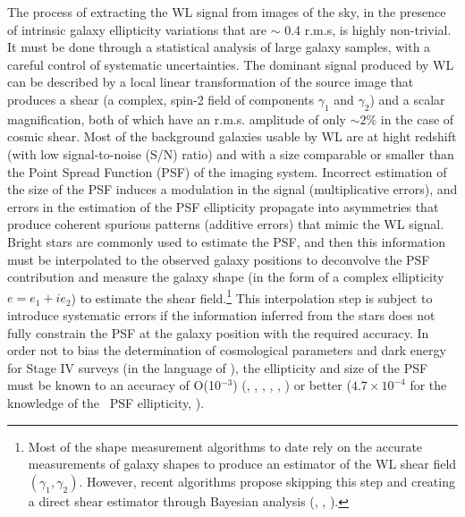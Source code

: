 \documentclass[11pt,preprint,flushrt]{aastex}
\begin{document}
The process of extracting the WL signal from images of the sky, in the presence of intrinsic galaxy ellipticity variations that are $\sim$ 0.4 r.m.s, is highly non-trivial. It must be done through a statistical analysis of large galaxy samples, with a careful control of systematic uncertainties. The dominant signal produced by WL can be described by a local linear transformation of the source image that produces a shear (a complex, spin-2 field of components $\gamma_1$ and $\gamma_2$) and a scalar magnification, both of which have an r.m.s. amplitude of only $\sim 2 \%$ in the case of cosmic shear. Most of the background galaxies usable by WL are at hight redshift (with low signal-to-noise (S/N) ratio) and with a size comparable or smaller than the Point Spread Function (PSF) of the imaging system. Incorrect estimation of the size of the PSF induces a modulation in the signal (multiplicative errors), and errors in the estimation of the PSF ellipticity propagate into asymmetries that produce coherent spurious patterns (additive errors) that mimic the WL signal. Bright stars are commonly used to estimate the PSF, and then this information must be interpolated to the observed galaxy positions to deconvolve the PSF contribution and measure the galaxy shape (in the form of a complex ellipticity $e=e_1 + i e_2$) to estimate the shear field.\footnote{Most of the shape measurement algorithms to date rely on the accurate measurements of galaxy shapes to produce an estimator of the WL shear field $(\gamma_1, \gamma_2)$. However, recent algorithms propose skipping this step and creating a direct shear estimator through Bayesian analysis (\citealt{bernstein14}, \citealt{bernstein15}, \citealt{schneider15}).} This interpolation step is subject to introduce systematic errors if the information inferred from the stars does not fully constrain the PSF at the galaxy position with the required accuracy. In order not to bias the determination of cosmological parameters and dark energy for Stage IV surveys (in the language of \citealt{albrecht06}), the ellipticity and size of the PSF must be known to an accuracy of O(10$^{-3}$) (\citealt{huterer06}, \citealt{amara08}, \citealt{paulin08}, \citealt{paulin09}, \citealt{massey13}, \citealt{cropper13}) or better ($4.7 \times 10^{-4}$ for the knowledge of the \wfa\ PSF ellipticity, \citealt{spergel13}).

\end{document}

